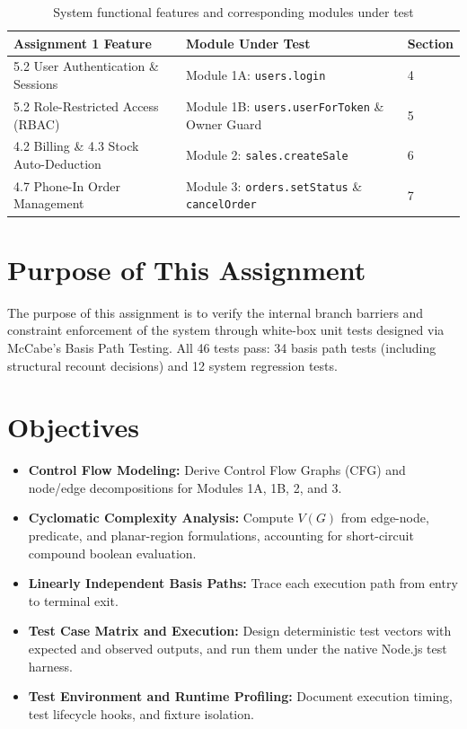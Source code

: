 \documentclass[12pt, a4paper]{report}
\begin{document}
\begin{table}[H]
\centering
\footnotesize
\begin{tabularx}{\textwidth}{L{5.0cm} L{8.0cm} C{2.0cm}}
\toprule
\textbf{Assignment 1 Feature} & \textbf{Module Under Test} & \textbf{Section} \\
 User Authentication \& Sessions & Module 1A: \texttt{users.login} & 4 \\
5.2 Role-Restricted Access (RBAC) & Module 1B: \texttt{users.userForToken} \& Owner Guard & 5 \\
4.2 Billing \& 4.3 Stock Auto-Deduction & Module 2: \texttt{sales.createSale} & 6 \\
4.7 Phone-In Order Management & Module 3: \texttt{orders.setStatus} \& \texttt{cancelOrder} & 7 \\
\bottomrule
\end{tabularx}
\caption{System functional features and corresponding modules under test}
\label{tab:modules}
\end{table}

\section{Purpose of This Assignment}
The purpose of this assignment is to verify the internal branch barriers and constraint enforcement of the system through white-box unit tests designed via McCabe's Basis Path Testing. All 46 tests pass: 34 basis path tests (including structural recount decisions) and 12 system regression tests.

\section{Objectives}
\begin{itemize}[leftmargin=1.5em]
  \item \textbf{Control Flow Modeling:} Derive Control Flow Graphs (CFG) and node/edge decompositions for Modules 1A, 1B, 2, and 3.
  \item \textbf{Cyclomatic Complexity Analysis:} Compute $V(G)$ from edge-node, predicate, and planar-region formulations, accounting for short-circuit compound boolean evaluation.
  \item \textbf{Linearly Independent Basis Paths:} Trace each execution path from entry to terminal exit.
  \item \textbf{Test Case Matrix and Execution:} Design deterministic test vectors with expected and observed outputs, and run them under the native Node.js test harness.
  \item \textbf{Test Environment and Runtime Profiling:} Document execution timing, test lifecycle hooks, and fixture isolation.
\end{itemize}
\end{document}

